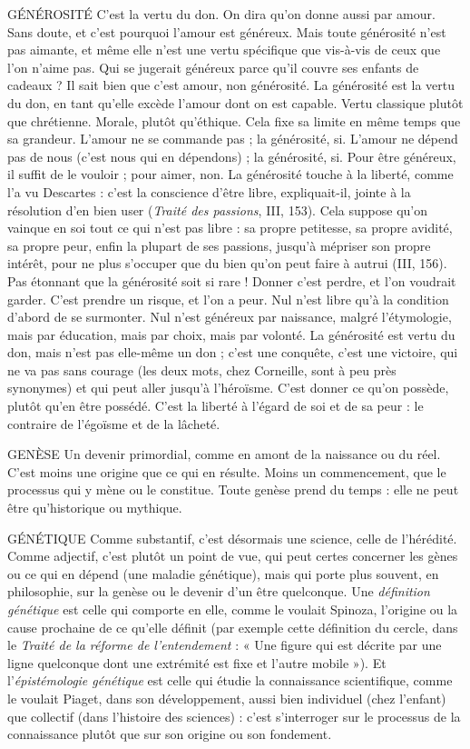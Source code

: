 GÉNÉROSITÉ C’est la vertu du don. On dira qu’on donne aussi par
amour. Sans doute, et c’est pourquoi l’amour est généreux.
Mais toute générosité n’est pas aimante, et même elle n’est une vertu spécifique
que vis-à-vis de ceux que l’on n'aime pas. Qui se jugerait généreux parce qu’il
couvre ses enfants de cadeaux ? Il sait bien que c’est amour, non générosité. La
générosité est la vertu du don, en tant qu’elle excède l'amour dont on est
capable. Vertu classique plutôt que chrétienne. Morale, plutôt qu’éthique. Cela
fixe sa limite en même temps que sa grandeur. L'amour ne se commande pas ;
la générosité, si. L'amour ne dépend pas de nous (c’est nous qui en
dépendons) ; la générosité, si. Pour être généreux, il suffit de le vouloir ; pour
aimer, non. La générosité touche à la liberté, comme l’a vu Descartes : c’est la
conscience d’être libre, expliquait-il, jointe à la résolution d’en bien user ({\it Traité
des passions}, III, 153). Cela suppose qu’on vainque en soi tout ce qui n’est pas
libre : sa propre petitesse, sa propre avidité, sa propre peur, enfin la plupart de
ses passions, jusqu’à mépriser son propre intérêt, pour ne plus s’occuper que du
bien qu’on peut faire à autrui (III, 156). Pas étonnant que la générosité soit si
rare ! Donner c’est perdre, et l’on voudrait garder. C’est prendre un risque, et
l’on a peur. Nul n’est libre qu’à la condition d’abord de se surmonter. Nul n’est
généreux par naissance, malgré l’étymologie, mais par éducation, mais par
choix, mais par volonté. La générosité est vertu du don, mais n’est pas elle-même
un don ; c’est une conquête, c’est une victoire, qui ne va pas sans courage
(les deux mots, chez Corneille, sont à peu près synonymes) et qui peut
aller jusqu’à l’héroïsme. C’est donner ce qu’on possède, plutôt qu’en être possédé.
C’est la liberté à l'égard de soi et de sa peur : le contraire de l’égoïsme et
de la lâcheté.

GENÈSE Un devenir primordial, comme en amont de la naissance ou du
réel. C’est moins une origine que ce qui en résulte. Moins un commencement,
que le processus qui y mène ou le constitue. Toute genèse prend
du temps : elle ne peut être qu’historique ou mythique.

GÉNÉTIQUE Comme substantif, c’est désormais une science, celle de
l’hérédité. Comme adjectif, c’est plutôt un point de vue, qui
peut certes concerner les gènes ou ce qui en dépend (une maladie génétique),
mais qui porte plus souvent, en philosophie, sur la genèse ou le devenir d’un
être quelconque. Une {\it définition génétique} est celle qui comporte en elle, comme
le voulait Spinoza, l’origine ou la cause prochaine de ce qu’elle définit (par
exemple cette définition du cercle, dans le {\it Traité de la réforme de l'entendement} :
« Une figure qui est décrite par une ligne quelconque dont une extrémité est
fixe et l’autre mobile »). Et l’{\it épistémologie génétique} est celle qui étudie la
connaissance scientifique, comme le voulait Piaget, dans son développement,
aussi bien individuel (chez l’enfant) que collectif (dans l’histoire des sciences) :
c’est s'interroger sur le processus de la connaissance plutôt que sur son origine
ou son fondement.

